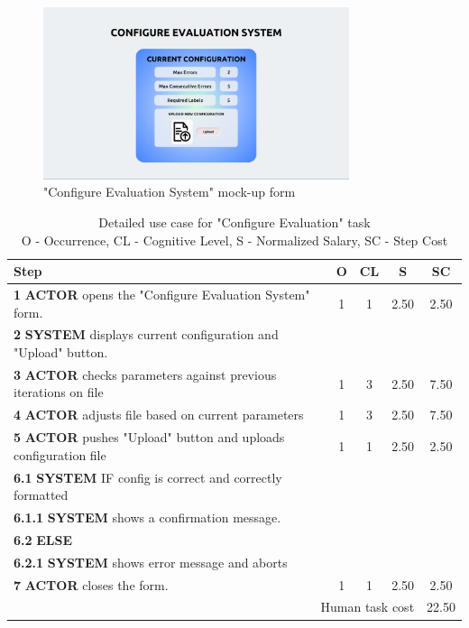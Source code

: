\begin{figure}[H]
\centering
\includegraphics[width=0.8\textwidth]{figures/ui_configure_evaluation.png}
\caption{"Configure Evaluation System" mock-up form}
\end{figure}

\begin{table}[H]
\centering
\begin{tabularx}{\textwidth}{|X|c|c|c|c|}
\hline
\textbf{Step} & \textbf{O} & \textbf{CL} & \textbf{S} & \textbf{SC} \\
\hline
\textbf{1} \textbf{ACTOR} opens the "Configure Evaluation System" form. & 1 & 1 & 2.50 & 2.50 \\
\hline
\textbf{2} \textbf{SYSTEM} displays current configuration and "Upload" button. & & & & \\
\hline
\textbf{3} \textbf{ACTOR} checks parameters against previous iterations on file & 1 & 3 & 2.50 & 7.50 \\
\hline
\textbf{4} \textbf{ACTOR} adjusts file based on current parameters & 1 & 3 & 2.50 & 7.50 \\
\hline
\textbf{5} \textbf{ACTOR} pushes "Upload" button and uploads configuration file & 1 & 1 & 2.50 & 2.50 \\
\hline
\textbf{6.1} \textbf{SYSTEM} IF config is correct and correctly formatted & & & & \\
\hline
\textbf{6.1.1} \textbf{SYSTEM} shows a confirmation message. & & & & \\
\hline
\textbf{6.2} \textbf{ELSE} & & & & \\
\hline
\textbf{6.2.1} \textbf{SYSTEM} shows error message and aborts & & & & \\
\hline
\textbf{7} \textbf{ACTOR} closes the form. & 1 & 1 & 2.50 & 2.50 \\
\hline
\multicolumn{4}{|r|}{Human task cost} & 22.50 \\
\hline
\end{tabularx}
\caption{Detailed use case for "Configure Evaluation" task\\ 
O - Occurrence, CL - Cognitive Level, S - Normalized Salary, SC - Step Cost}
\label{table:configure_evaluation_system}
\end{table}

